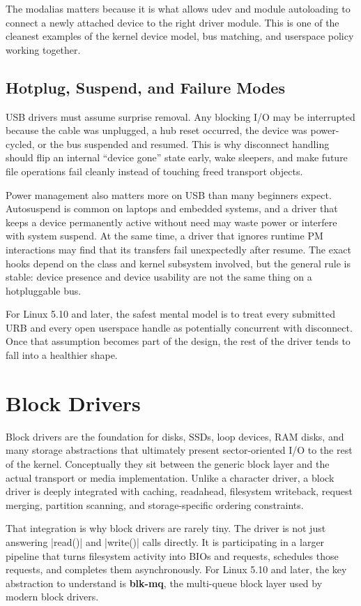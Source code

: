 \documentclass[10pt, oneside]{book}
\begin{document}
The modalias matters because it is what allows udev and module autoloading to
connect a newly attached device to the right driver module.
This is one of the cleanest examples of the kernel device model, bus matching,
and userspace policy working together.

\subsection{Hotplug, Suspend, and Failure Modes}
\label{sec:usb_hotplug}
USB drivers must assume surprise removal.
Any blocking I/O may be interrupted because the cable was unplugged, a hub reset
occurred, the device was power-cycled, or the bus suspended and resumed.
This is why disconnect handling should flip an internal ``device gone'' state
early, wake sleepers, and make future file operations fail cleanly instead of
touching freed transport objects.

Power management also matters more on USB than many beginners expect.
Autosuspend is common on laptops and embedded systems, and a driver that keeps a
device permanently active without need may waste power or interfere with system
suspend.
At the same time, a driver that ignores runtime PM interactions may find that
its transfers fail unexpectedly after resume.
The exact hooks depend on the class and kernel subsystem involved, but the
general rule is stable: device presence and device usability are not the same
thing on a hotpluggable bus.

For Linux 5.10 and later, the safest mental model is to treat every submitted URB and every
open userspace handle as potentially concurrent with disconnect.
Once that assumption becomes part of the design, the rest of the driver tends to
fall into a healthier shape.

\section{Block Drivers}
\label{sec:block}
Block drivers are the foundation for disks, SSDs, loop devices, RAM disks, and
many storage abstractions that ultimately present sector-oriented I/O to the
rest of the kernel.
Conceptually they sit between the generic block layer and the actual transport
or media implementation.
Unlike a character driver, a block driver is deeply integrated with caching,
readahead, filesystem writeback, request merging, partition scanning, and
storage-specific ordering constraints.

That integration is why block drivers are rarely tiny.
The driver is not just answering \cpp|read()| and \cpp|write()| calls directly.
It is participating in a larger pipeline that turns filesystem activity into
BIOs and requests, schedules those requests, and completes them asynchronously.
For Linux 5.10 and later, the key abstraction to understand is \textbf{blk-mq}, the
multi-queue block layer used by modern block drivers.
\end{document}
